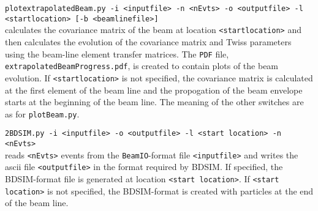 \begin{description}
  \item{\texttt{plotextrapolatedBeam.py -i <inputfile> -n <nEvts> -o <outputfile> -l <startlocation> [-b <beamlinefile>]}} \\
    calculates the covariance matrix of the beam at
    location \texttt{<startlocation>} and then calculates the
    evolution of the covariance matrix and Twiss parameters using the
    beam-line element transfer matrices.
    The \texttt{PDF} file, \texttt{extrapolatedBeamProgress.pdf}, is
    created to contain plots of the beam evolution.
    If \texttt{<startlocation>} is not specified, the covariance
    matrix is calculated at the first element of the beam line and
    the propogation of the beam envelope starts at the beginning of
    the beam line.
    The meaning of the other switches are as
    for \texttt{plotBeam.py}.
  \item{\texttt{2BDSIM.py -i <inputfile> -o <outputfile> -l <start location> -n <nEvts>}} \\
    reads \texttt{<nEvts>} events from the \texttt{BeamIO}-format
    file \texttt{<inputfile>} and writes the ascii
    file \texttt{<outputfile>} in the format required by BDSIM.
    If specified, the BDSIM-format file is generated at
    location \texttt{<start location>}.
    If \texttt{<start location>} is not specified, the BDSIM-format is
    created with particles at the end of the beam line.
\end{description}
